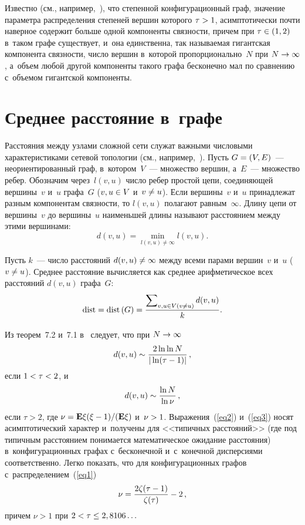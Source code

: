 \begin{multicols}{2}
Известно (см., например,~\cite{Dur,Hof1,RN}), что степенной конфигурационный граф, значение па\-ра\-мет\-ра
распределения степеней вершин которого $\tau\hm>1$, асимптотически почти наверное содержит больше одной
компоненты связности, причем при $\tau\hm\in(1,2)$ в~таком графе существует, и~она единственна, так
называемая гигантская компонента связ\-ности, чис\-ло вершин в~которой пропорционально~$N$
при $N\hm\rightarrow\infty$, а~объем любой другой компоненты такого графа бесконечно мал по
сравнению с~объемом гигантской компоненты.


\vspace*{-6pt}

\section{Среднее расстояние в~графе}

\vspace*{-2pt}

Расстояния между узлами сложной сети служат важными числовыми характеристиками сетевой
топологии (см., например,~\cite{Hof2, Chu}).
Пусть $G \hm= (V,E)$~--- неориентированный граф, в~котором~$V$~--- множество вершин, а~$E$~--- множество ребер.
Обозначим через~$l(v,u)$ чис\-ло ребер простой цепи, со\-еди\-ня\-ющей вершины~$v$ и~$u$ графа~$G$
($v,u\hm\in V$ и~$v\hm\neq u$). Если вершины~$v$ и~$u$ принадлежат разным компонентам связ\-ности, то $l(v,u)$
полагают равным~$\infty$. Длину цепи от вершины~$v$ до вершины~$u$ наименьшей длины называют расстоянием
между этими вершинами:
$$
d(v,u)=\min\limits_{l(v,u)\neq\infty}l(v,u).
$$

Пусть $k$~--- чис\-ло рас\-сто\-яний $d(v,u)\hm\neq\infty$ между всеми парами вершин~$v$ и~$u$ ($v\hm\neq u$).
Среднее расстояние вы\-чис\-ля\-ет\-ся как среднее арифметическое всех рас\-сто\-яний $d(v,u)$ графа~$G$:
\begin{equation*}
\mathrm{dist} = \mathrm{dist}\,(G) = \displaystyle\frac{\displaystyle \sum\nolimits_{v,u\in V(v\neq u)}d(v,u)\mathstrut}{\displaystyle k\mathstrut}.
\end{equation*}

Из теорем~7.2 и~7.1 в~\cite{Hof2} следует, что при $N\hm\rightarrow\infty$ 
\begin{equation}
\label{eq2}
d(v,u)\sim\displaystyle\frac{\displaystyle 2\ln\ln N\mathstrut}{\displaystyle |\ln(\tau-1)|\mathstrut}\,,
\end{equation}
если $1\hm<\tau\hm<2$,
и
\begin{equation}
\label{eq3}
d(v,u)\sim\displaystyle\frac{\displaystyle \ln N\mathstrut}{\displaystyle \ln\nu\mathstrut}\,,
\end{equation}
если $\tau>2$, 
где $\nu={\bf E}\xi(\xi-1)/({\bf E}\xi)$ и~$\nu\hm>1$.
Выражения~(\ref{eq2}) и~(\ref{eq3}) носят асимптотический характер и~получены для <<типичных рас\-сто\-яний>>
(где под типичным рас\-сто\-яни\-ем понимается математическое ожидание рас\-сто\-яния)~\cite{Hof2} в~конфигурационных
графах с~бесконечной и~с~конечной дис\-пер\-си\-ями соответственно.
Легко показать, что для конфигурационных графов с~распределением~(\ref{eq1})
$$
\nu=\displaystyle\frac{\displaystyle 2\zeta(\tau-1)\mathstrut}{\displaystyle \zeta(\tau)\mathstrut}-2\,,
$$
причем $\nu>1$ при $2\hm<\tau\hm\leq 2,8106\ldots$


\end{multicols}
